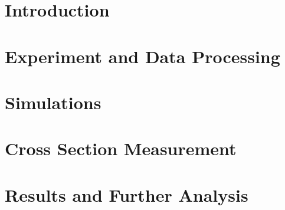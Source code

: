 \documentclass[12pt,twoside]{mitthesis}
\begin{document}


\chapter{Introduction} \label{Chapter:Intro}
    


\chapter{Experiment and Data Processing} \label{Chapter:Experiment}
    

\chapter{Simulations} \label{Chapter:Simulations}
    

\chapter{Cross Section Measurement} \label{Chapter:BaseAnalysis}
    

\chapter{Results and Further Analysis} \label{Chapter:Further Analysis}
    





\printbibliography

\appendix
%


\end{document}
